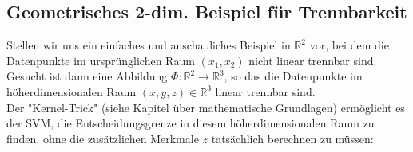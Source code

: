\documentclass[12pt]{article}
\begin{document}
\subsection{Geometrisches 2-dim. Beispiel für Trennbarkeit}
%
Stellen wir uns ein einfaches und anschauliches Beispiel in $\mathbb{R}^2$ vor, bei dem die Datenpunkte im ursprünglichen Raum $(x_1,x_2)$ nicht linear trennbar sind.\\ 
Gesucht ist dann eine Abbildung $\Phi:\mathbb{R}^2 \rightarrow\mathbb{R}^3$, so das die Datenpunkte im höherdimensionalen Raum $(x,y,z)\in  \mathbb{R}^3$ linear trennbar sind.\\ 
Der "Kernel-Trick" (siehe Kapitel über mathematische Grundlagen) ermöglicht es der SVM, die Entscheidungsgrenze in diesem höherdimensionalen Raum zu finden, ohne die zusätzlichen Merkmale $z$ tatsächlich berechnen zu müssen: 
\end{document}
